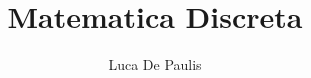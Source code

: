 \documentclass[italian,oneside,headinclude,10pt]{scrbook}
\begin{document}
\author{Luca De Paulis}
\title{Matematica Discreta}
\maketitle

\tableofcontents






\end{document}
